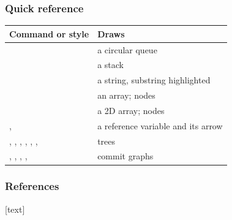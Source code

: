 \documentclass[aspectratio=169,10pt,compress]{beamer}
\begin{document}
\begin{frame}[t,fragile] \frametitle{Quick reference}

\begin{table}
		\scriptsize
		\begin{tabular}{@{}L{0.55\textwidth}L{0.37\textwidth}@{}}
			\toprule
			\textbf{Command or style} & \textbf{Draws} \\
			\midrule
			 & a circular queue \\
			 & a stack \\
			 & a string, substring highlighted \\
			 & an array; nodes  \\
			 & a 2D array; nodes  \\
			,  & a reference variable and its arrow \\
			, , , , , ,  & trees \\
			, , , ,  & commit graphs \\
			\bottomrule
		\end{tabular}
\end{table}%
\end{frame}




\begin{frame}[t,fragile] \frametitle{References}
	[text]
	
	\tiny
\end{frame}
\end{document}
